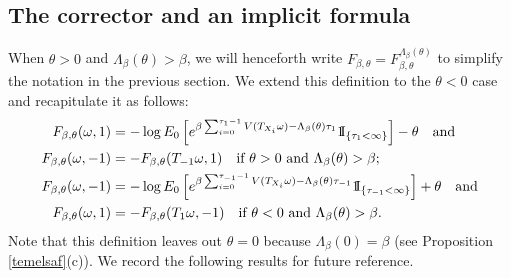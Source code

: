 \documentclass[a4paper]{amsart}
\numberwithin{equation}{section}
\theoremstyle{plain}
\theoremstyle{remark}
\begin{document}
\subsection{The corrector and an implicit formula}\label{korgozu}

When $\theta > 0$ and $\Lambda_\beta(\theta) > \beta$, we will henceforth write $F_{\beta,\theta} = F_{\beta,\theta}^{\Lambda_\beta(\theta)}$ to simplify the notation in the previous section. We extend this definition to the $\theta < 0$ case and recapitulate it as follows:
\begin{equation}
\begin{aligned}\label{gaztap}
F_{\beta,\theta}(\omega,1) &= - \log E_0\left[e^{\beta\sum_{i=0}^{\tau_{1}-1}V(T_{X_i}\omega) - \Lambda_\beta(\theta)\tau_{1}}{{{\rm 1\mkern-1.5mu}\!{\rm I}}}_{\{\tau_{1}<\infty\}}\right] - \theta\quad\text{and}\\ F_{\beta,\theta}(\omega,-1) &= -F_{\beta,\theta}(T_{-1}\omega,1)\quad\text{if $\theta > 0$ and $\Lambda_\beta(\theta) > \beta$;}\\
F_{\beta,\theta}(\omega,-1) &= - \log E_0\left[e^{\beta\sum_{i=0}^{\tau_{-1}-1}V(T_{X_i}\omega) - \Lambda_\beta(\theta)\tau_{-1}}{{{\rm 1\mkern-1.5mu}\!{\rm I}}}_{\{\tau_{-1}<\infty\}}\right] + \theta\quad\text{and}\\
F_{\beta,\theta}(\omega,1) &= -F_{\beta,\theta}(T_{1}\omega,-1)\quad\text{if $\theta < 0$ and $\Lambda_\beta(\theta) > \beta$.}
\end{aligned}
\end{equation}
Note that this definition leaves out $\theta = 0$ because $\Lambda_\beta(0) = \beta$ (see Proposition \ref{temelsaf}(c)). We record the following results for future reference.
\end{document}
